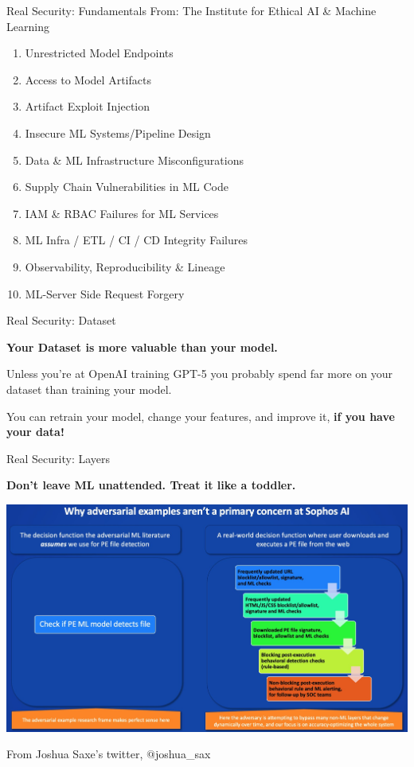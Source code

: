 \documentclass{beamer}
\begin{document}
\begin{frame}{Real Security: Fundamentals}
    From: The Institute for Ethical AI \& Machine Learning \cite{mlsecops_10}
    \begin{enumerate}
        \item Unrestricted Model Endpoints
        \item Access to Model Artifacts 
        \item Artifact Exploit Injection 
        \item Insecure ML Systems/Pipeline Design
        \item Data \& ML Infrastructure Misconfigurations
        \item Supply Chain Vulnerabilities in ML Code
        \item IAM \& RBAC Failures for ML Services
        \item ML Infra / ETL / CI / CD Integrity Failures
        \item Observability, Reproducibility \& Lineage
        \item ML-Server Side Request Forgery
    \end{enumerate}
\end{frame}

\begin{frame}{Real Security: Dataset}
    \begin{center}
        \textbf{Your Dataset is more valuable than your model.}
        \vspace{20pt}

        Unless you're at OpenAI training GPT-5 you probably spend far more on your dataset than training your model.
        \vspace{10pt}

        You can retrain your model, change your features, and improve it, \textbf{if you have your data!}
    \end{center}
\end{frame}

\begin{frame}{Real Security: Layers}
    \begin{center}
        \textbf{Don't leave ML unattended. Treat it like a toddler.}
        \vspace{10pt}

        \includegraphics[scale=0.15]{sophos_ML_model.jpg}

        From Joshua Saxe's twitter, $@$joshua\_sax
    \end{center}
\end{frame}
\end{document}
